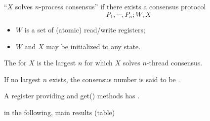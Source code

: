 \begin{frame}{}
  \begin{definition}
    ``$X$ solves $n$-process consensus'' if there exists a consensus protocol
    \[
      P_1, \cdots, P_n; W, X
    \]
    \begin{itemize}
      \item $W$ is a set of (atomic) read/write registers;
      \item $W$ and $X$ may be initialized to any state.
    \end{itemize}
  \end{definition}
\end{frame}

\begin{frame}{}
  \begin{definition}
    The  for $X$ is the largest $n$ 
    for which $X$ solves $n$-thread consensus.

    \vspace{0.30cm}
    If no largest $n$ exists, the consensus number is said to be .
  \end{definition}
\end{frame}

\begin{frame}{}
  \begin{theorem}
    A register providing  and \textsf{get()} methods
    has  .
  \end{theorem}

  \vspace{-0.30cm}
\end{frame}

\begin{frame}{}
  \begin{lemma}[$Y$ Implements $X$]
  \end{lemma}

  \vspace{0.50cm}
  \begin{theorem}
  \end{theorem}
\end{frame}

\begin{frame}{}
  in the following, main results (table)
\end{frame}

